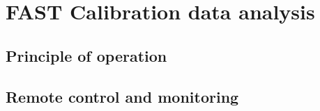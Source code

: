 
\chapter{FAST Calibration data analysis}

\section{Principle of operation}


\section{Remote control and monitoring}


\section{}



